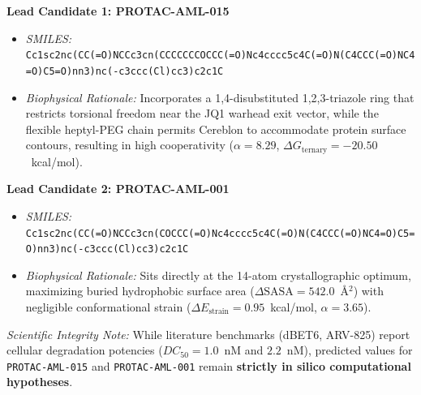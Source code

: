 \documentclass[conference]{IEEEtran}
\begin{document}
\textbf{Lead Candidate 1: PROTAC-AML-015}
\begin{itemize}
    \item \textit{SMILES:} \texttt{Cc1sc2nc(CC(=O)NCCc3cn(CCCCCCCOCCC(=O)Nc4cccc5c4C(=O)N(C4CCC(=O)NC4=O)C5=O)nn3)nc(-c3ccc(Cl)cc3)c2c1C}
    \item \textit{Biophysical Rationale:} Incorporates a 1,4-disubstituted 1,2,3-triazole ring that restricts torsional freedom near the JQ1 warhead exit vector, while the flexible heptyl-PEG chain permits Cereblon to accommodate protein surface contours, resulting in high cooperativity ($\alpha = 8.29$, $\Delta G_{\text{ternary}} = -20.50$~kcal/mol).
\end{itemize}

\textbf{Lead Candidate 2: PROTAC-AML-001}
\begin{itemize}
    \item \textit{SMILES:} \texttt{Cc1sc2nc(CC(=O)NCCc3cn(COCCC(=O)Nc4cccc5c4C(=O)N(C4CCC(=O)NC4=O)C5=O)nn3)nc(-c3ccc(Cl)cc3)c2c1C}
    \item \textit{Biophysical Rationale:} Sits directly at the 14-atom crystallographic optimum, maximizing buried hydrophobic surface area ($\Delta\text{SASA} = 542.0$~\AA$^2$) with negligible conformational strain ($\Delta E_{\text{strain}} = 0.95$~kcal/mol, $\alpha = 3.65$).
\end{itemize}

\textit{Scientific Integrity Note:} While literature benchmarks (dBET6, ARV-825) report cellular degradation potencies ($DC_{50} = 1.0$~nM and $2.2$~nM), predicted values for \texttt{PROTAC-AML-015} and \texttt{PROTAC-AML-001} remain \textbf{strictly in silico computational hypotheses}.
\end{document}
